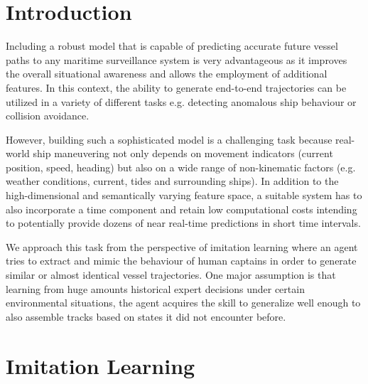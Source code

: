 \documentclass[conference]{IEEEtran}
\begin{document}
\section{Introduction}
Including a robust model that is capable of predicting accurate future vessel paths to any maritime surveillance system is very advantageous as it improves the overall situational awareness and allows the employment of additional features. In this context, the ability to generate end-to-end trajectories can be utilized in a variety of different tasks e.g. detecting anomalous ship behaviour or collision avoidance.
\par
However, building such a sophisticated model is a challenging task because real-world ship maneuvering not only depends on movement indicators (current position, speed, heading) but also on a wide range of non-kinematic factors (e.g. weather conditions, current, tides and surrounding ships). In addition to the high-dimensional and semantically varying feature space, a suitable system has to also incorporate a time component and retain low computational costs intending to potentially provide dozens of near real-time predictions in short time intervals.
\par
We approach this task from the perspective of imitation learning where an agent tries to extract and mimic the behaviour of human captains in order to generate similar or almost identical vessel trajectories. One major assumption is that learning from huge amounts historical expert decisions under certain environmental situations, the agent acquires the skill to generalize well enough to also assemble tracks based on states it did not encounter before.

\section{Imitation Learning}
\end{document}
